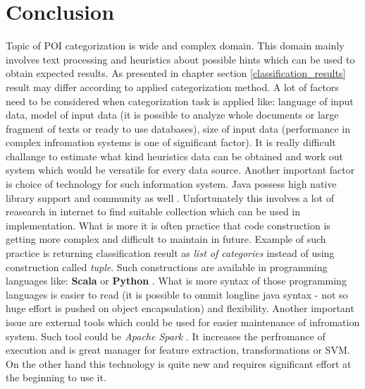 \section{Conclusion}
Topic of POI categorization is wide and complex domain. This domain mainly involves text processing and heuristics about possible hints which can be used to obtain expected results. As presented in chapter section \ref{classification_results} result may differ according to applied categorization method. A lot of factors need to be considered when categorization task is applied like: language of input data, model of input data (it is possible to analyze whole documents or large fragment of texts or ready to use databases), size of input data (performance in complex infromation systems is one of significant factor). It is really difficult challange to estimate what kind heuristics data can be obtained and work out system which would be versatile for every data source. Another important factor is choice of technology for such information system. Java possess high native library support and community as well \cite{24} \cite{25}. Unfortunately this involves a lot of reasearch in internet to find suitable collection which can be used in implementation. What is more it is often practice that code construction is getting more complex and difficult to maintain in future. Example of such practice is returning classification result as \textit{list of categories} instead of using construction called \textit{tuple}. Such constructions are available in programming languages like: \textbf{Scala} \cite{26} or \textbf{Python} \cite{27}. What is more syntax of those programming languages is easier to read (it is possible to ommit longline java syntax - not so huge effort is pushed on object encapsulation) and flexibility. Another important issue are external tools which could be used for easier maintenance of infromation system. Such tool could be \textit{Apache Spark} \cite{28}. It increases the perfromance of execution and is great manager for feature extraction, transformations or SVM. On the other hand this technology is quite new and requires significant effort at the beginning to use it.     